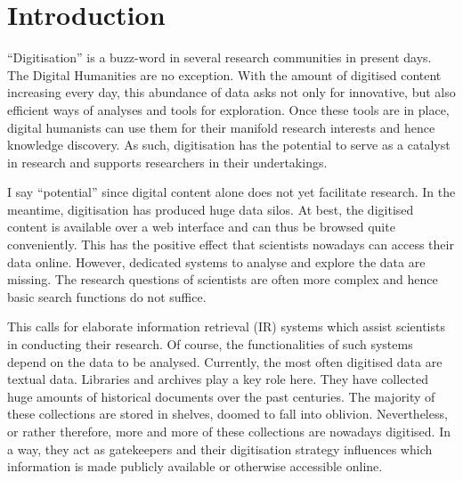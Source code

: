 

\section{Introduction}
``Digitisation'' is a buzz-word in several research communities in present days. The Digital Humanities are no exception. With the amount of digitised content increasing every day, this abundance of data asks not only for innovative, but also efficient ways of analyses and tools for exploration. Once these tools are in place, digital humanists can use them for their manifold research interests and hence knowledge discovery. As such, digitisation has the potential to serve as a catalyst in research and supports researchers in their undertakings.

I say ``potential'' since digital content alone does not yet facilitate research. In the meantime, digitisation has produced huge data silos. At best, the digitised content is available over a web interface and can thus be browsed quite conveniently. This has the positive effect that scientists nowadays can access their data online. However, dedicated systems to analyse and explore the data are missing. The research questions of scientists are often more complex and hence basic search functions do not suffice.

This calls for elaborate information retrieval (IR) systems which assist scientists in conducting their research. Of course, the functionalities of such systems depend on the data to be analysed. Currently, the most often digitised data are textual data. Libraries and archives play a key role here. They have collected huge amounts of historical documents over the past centuries. The majority of these collections are stored in shelves, doomed to fall into oblivion. Nevertheless, or rather therefore, more and more of these collections are nowadays digitised. In a way, they act as gatekeepers and their digitisation strategy influences which information is made publicly available or otherwise accessible online.  

